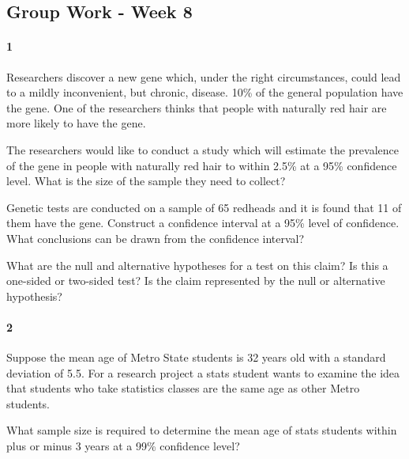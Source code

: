 \documentclass{article}
\begin{document}
\begin{flushleft}
\section*{Group Work - Week 8}
\paragraph{1} Researchers discover a new gene which, under the right circumstances, could lead to a mildly inconvenient, but chronic, disease. 10\% of the general population have the gene. One of the researchers thinks that people with naturally red hair are more likely to have the gene.
\begin{enumalpha}
\item The researchers would like to conduct a study which will estimate the prevalence of the gene in people with naturally red hair to within 2.5\% at a 95\% confidence level. What is the size of the sample they need to collect?
\vspace{2in}

\item Genetic tests are conducted on a sample of 65 redheads and it is found that 11 of them have the gene. Construct a confidence interval at a 95\% level of confidence. What conclusions can be drawn from the confidence interval?\\
\vspace{2in}

\item What are the null and alternative hypotheses for a test on this claim? Is this a one-sided or two-sided test? Is the claim represented by the null or alternative hypothesis?
\end{enumalpha}



\newpage
\paragraph{2} Suppose the mean age of Metro State students is 32 years old with a standard deviation of 5.5. For a research project a stats student wants to examine the idea that students who take statistics classes are the same age as other Metro students. 
\begin{enumalpha}
\item What sample size is required to determine the mean age of stats students within plus or minus 3 years at a 99\% confidence level?\\
\vspace{2in}


\end{enumalpha}
\end{flushleft}
\end{document}
